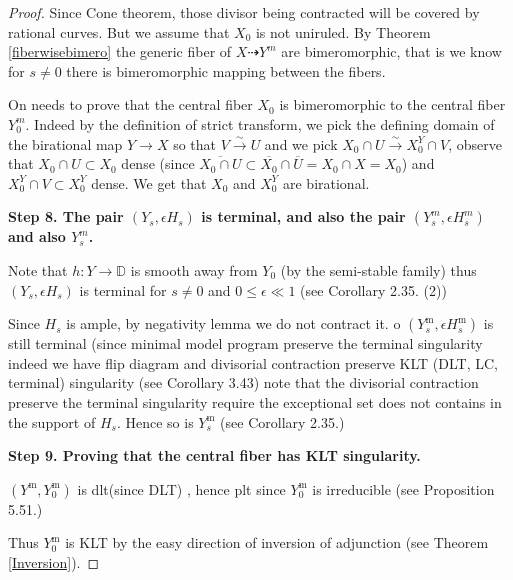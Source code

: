 \documentclass[11pt]{article}
\theoremstyle{definition}
\begin{document}
\begin{proof}
		Since Cone theorem, those divisor being contracted will be covered by rational curves. But we assume that $X_0$ is not uniruled. By Theorem \ref{fiberwisebimero} the generic fiber of $X \dashrightarrow Y^m$ are bimeromorphic, that is we know for $s\ne 0$ there is bimeromorphic mapping between the fibers.
		
		On needs to prove that the central fiber $X_0$ is bimeromorphic to the central fiber $Y_0^m$. Indeed by the definition of strict transform, we pick the defining domain of the birational map $Y \to X$ so that $V\stackrel{\sim}\to U$ and we pick $X_0 \cap U \stackrel{\sim}\to X_0^Y \cap V$, observe that $X_0\cap U \subset X_0$ dense (since $\overline{ X_0 \cap U}\subset \overline{X_0}\cap \overline{U} = X_0 \cap X = X_0$) and $X_0^Y \cap V\subset X_0^Y$ dense. We get that $X_0$ and $X_0^Y$ are birational.
		
		\textbf{Step 8. The pair $(Y_s,\epsilon H_s)$ is terminal, and also the pair $(Y_s^m, \epsilon H_s^m)$ and also $Y_s^m$.}
		
		Note that $h:Y \to \mathbb{D}$ is smooth away from $Y_0$ (by the semi-stable family) thus $\left(Y_s, \epsilon H_s\right)$ is terminal for $s \neq 0$ and $0 \leq \epsilon \ll 1$ (see \cite{KollarMori} Corollary 2.35. (2))
		
		Since $H_s$ is ample, by negativity lemma we do not contract it. o $\left(Y_s^{\mathrm{m}}, \epsilon H_s^{\mathrm{m}}\right)$ is still terminal (since minimal model program preserve the terminal singularity indeed we have flip diagram and divisorial contraction preserve KLT (DLT, LC, terminal) singularity (see \cite{KollarMori} Corollary 3.43) note that the divisorial contraction preserve the terminal singularity require the exceptional set does not contains in the support of $H_s$. Hence so is $Y_s^{\mathrm{m}}$ (see \cite{KollarMori} Corollary 2.35.)
		
		\textbf{Step 9. Proving that the central fiber has KLT singularity.}
		
		
		 $\left(Y^{\mathrm{m}}, Y_0^{\mathrm{m}}\right)$ is dlt(since DLT) , hence plt since $Y_0^{\mathrm{m}}$ is irreducible (see \cite{KollarMori} Proposition 5.51.)
		 
		 Thus $Y_0^{\mathrm{m}}$ is KLT by the easy direction of inversion of adjunction (see Theorem \ref{Inversion}).
	\end{proof}
	\printbibliography	
	
\end{document}
